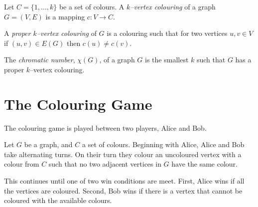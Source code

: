 \documentclass{beamer}
\begin{document}

\begin{frame}{\secname}
    
    Let $C=\{1,\dots,k\}$ be a set of colours. A \textit{$k$--vertex colouring} of a graph $G=(V,E)$ is a mapping $c\colon V \to C$. 
    
    \bigskip
    
    A \textit{proper $k$--vertex colouring} of $G$ is a colouring such that for two vertices $u,v\in V$ if $(u,v)\in E(G)$ then $c(u)\neq c(v)$.
    
    \bigskip
    \begin{definition}
    The \textit{chromatic number}, $\chi(G)$, of a graph $G$ is the smallest $k$ such that $G$ has a proper $k$--vertex colouring.
     \end{definition}
\end{frame}


\section{The Colouring Game}


\begin{frame}{\secname} 
        
        
    
    The colouring game is played between two players, Alice and Bob.
    
    \bigskip
    
    Let $G$ be a graph, and $C$ a set of colours. Beginning with Alice, Alice and Bob take alternating turns. On their turn they colour an uncoloured vertex with a colour from $C$ such that no two adjacent vertices in $G$ have the same colour. 
    
    \bigskip
    
    This continues until one of two win conditions are meet. First, Alice wins if all the vertices are coloured. Second, Bob wins if there is a vertex that cannot be coloured with the available colours.
\end{frame}

\end{document}

